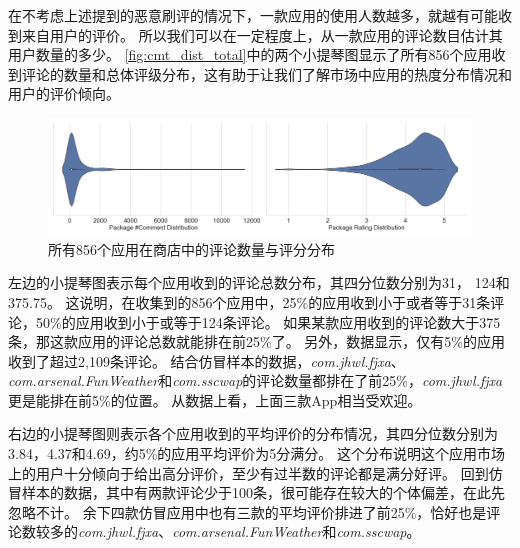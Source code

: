 在不考虑上述提到的恶意刷评的情况下，一款应用的使用人数越多，就越有可能收到来自用户的评价。
所以我们可以在一定程度上，从一款应用的评论数目估计其用户数量的多少。
\autoref{fig:cmt_dist_total}中的两个小提琴图显示了所有856个应用收到评论的数量和总体评级分布，这有助于让我们了解市场中应用的热度分布情况和用户的评价倾向。

%
%
%

\begin{figure}[htbp]
	\centering
	\includegraphics[width=\textwidth]{./Figures/edwin-360-comment-dist.png}
    \caption{所有856个应用在商店中的评论数量与评分分布}
    \label{fig:cmt_dist_total}
\end{figure}

左边的小提琴图表示每个应用收到的评论总数分布，其四分位数分别为31， 124和375.75。
这说明，在收集到的856个应用中，25\%的应用收到小于或者等于31条评论，50\%的应用收到小于或等于124条评论。
如果某款应用收到的评论数大于375条，那这款应用的评论总数就能排在前25\%了。
另外，数据显示，仅有5\%的应用收到了超过2,109条评论。
结合仿冒样本的数据，\emph{com.jhwl.fjxa}、\emph{com.arsenal.FunWeather}和\emph{com.sscwap}的评论数量都排在了前25\%，\emph{com.jhwl.fjxa}更是能排在前5\%的位置。
从数据上看，上面三款App相当受欢迎。

右边的小提琴图则表示各个应用收到的平均评价的分布情况，其四分位数分别为3.84，4.37和4.69，约5\%的应用平均评价为5分满分。
这个分布说明这个应用市场上的用户十分倾向于给出高分评价，至少有过半数的评论都是满分好评。
回到仿冒样本的数据，其中有两款评论少于100条，很可能存在较大的个体偏差，在此先忽略不计。
余下四款仿冒应用中也有三款的平均评价排进了前25\%，恰好也是评论数较多的\emph{com.jhwl.fjxa}、\emph{com.arsenal.FunWeather}和\emph{com.sscwap}。

